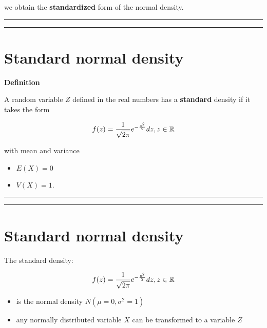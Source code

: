 \documentclass[
]{book}
\begin{document}
we obtain the \textbf{standardized} form of the normal density.

\begin{center}\rule{0.5\linewidth}{0.5pt}\end{center}

\begin{center}\rule{0.5\linewidth}{0.5pt}\end{center}

\hypertarget{standard-normal-density-1}{%
\section{Standard normal density}\label{standard-normal-density-1}}

\textbf{Definition}

A random variable \(Z\) defined in the real numbers has a \textbf{standard} density if it takes the form

\[f(z)=\frac{1}{\sqrt{2\pi}}e^{-\frac{z^2}{2}} dz,z \in {\Bbb R}\]

with mean and variance

\begin{itemize}
\item
  \(E (X) = 0\)
\item
  \(V (X) =1\).
\end{itemize}

\begin{center}\rule{0.5\linewidth}{0.5pt}\end{center}

\begin{center}\rule{0.5\linewidth}{0.5pt}\end{center}

\hypertarget{standard-normal-density-2}{%
\section{Standard normal density}\label{standard-normal-density-2}}

The standard density:

\[f(z)=\frac{1}{\sqrt{2\pi}}e^{-\frac{z^2}{2}} dz,z \in {\Bbb R}\]

\begin{itemize}
\item
  is the normal density \(N(\mu=0,\sigma^2=1)\)
\item
  any normally distributed variable \(X\) can be transformed to a variable \(Z\)
\end{itemize}
\end{document}
